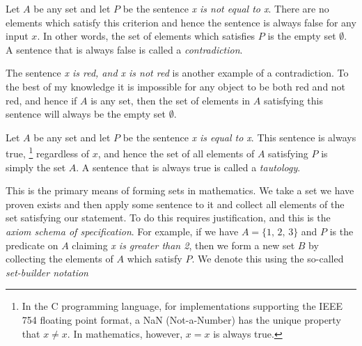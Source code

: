             \begin{example}
                Let $A$ be any set and let $P$ be the sentence
                \textit{x is not equal to x}. There are no elements which
                satisfy this criterion and hence the sentence is always false
                for any input $x$. In other words, the set of elements which
                satisfies $P$ is the empty set $\emptyset$. A sentence that is
                always false is called a
                \textit{contradiction}.
            \end{example}
            \begin{example}
                The sentence \textit{x is red, and x is not red} is another
                example of a contradiction. To the best of my knowledge it is
                impossible for any object to be both red and not red, and hence
                if $A$ is any set, then the set of elements in $A$ satisfying
                this sentence will always be the empty set $\emptyset$.
            \end{example}
            \begin{example}
                Let $A$ be any set and let $P$ be the sentence
                \textit{x is equal to x}. This sentence is always true,%
                \footnote{
                    In the C programming language, for implementations
                    supporting the IEEE 754 floating point format, a NaN
                    (Not-a-Number) has the unique property that $x\ne{x}$.
                    In mathematics, however, $x=x$ is always true.
                }
                regardless of $x$, and hence the set of all elements of $A$
                satisfying $P$ is simply the set $A$. A sentence that is always
                true is called a \textit{tautology}.
            \end{example}
            This is the primary means of forming sets in mathematics. We take a
            set we have proven exists and then apply some sentence to it and
            collect all elements of the set satisfying our statement. To do
            this requires justification, and this is the
            \textit{axiom schema of specification}. For example, if we have
            $A=\{1,\,2,\,3\}$ and $P$ is the predicate on $A$ claiming
            \textit{x is greater than 2}, then we form a new set $B$ by
            collecting the elements of $A$ which satisfy $P$. We denote this
            using the so-called
            \textit{set-builder notation}%
